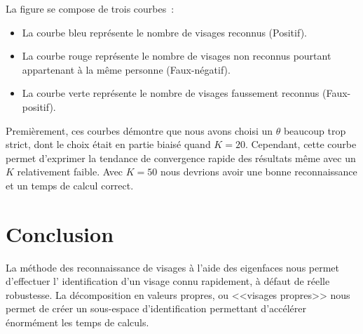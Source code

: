 \documentclass[a4paper]{article}
\begin{document}
La figure se compose de trois courbes~:
\begin{itemize}
    \item La courbe bleu représente le nombre de visages reconnus (Positif).
    \item La courbe rouge représente le nombre de visages non reconnus pourtant appartenant à la même personne
        (Faux-négatif).
    \item La courbe verte représente le nombre de visages faussement reconnus (Faux-positif).
\end{itemize}

Premièrement, ces courbes démontre que nous avons choisi un $\theta$ beaucoup trop strict, dont le choix était
en partie biaisé quand $K=20$.
Cependant, cette courbe permet d'exprimer la tendance de convergence rapide des résultats même avec un $K$
relativement faible. Avec $K=50$ nous devrions avoir une bonne reconnaissance et un temps de calcul correct.

\section{Conclusion}

La méthode des reconnaissance de visages à l'aide des eigenfaces nous permet d'effectuer l'
identification d'un visage connu rapidement, à défaut de réelle robustesse. 
La décomposition en valeurs propres, ou <<visages propres>> nous permet de créer un sous-espace
d'identification permettant d'accélérer énormément les temps de calculs.
\end{document}
